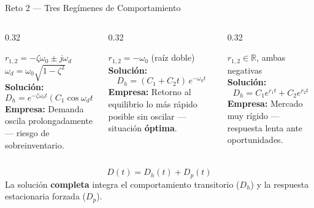 \documentclass[10pt,aspectratio=169]{beamer}
\begin{document}
\begin{frame}{Reto 2 — Tres Regímenes de Comportamiento}
  \begin{columns}[T]
    \begin{column}{0.32\textwidth}
      \begin{tcolorbox}[alertbox={Subamortiguado $\zeta < 1$}]
        \small
        $r_{1,2} = -\zeta\omega_0 \pm j\omega_d$\\[3pt]
        $\omega_d = \omega_0\sqrt{1-\zeta^2}$\\[6pt]
        \textbf{Solución:}
        \[
          D_h = e^{-\zeta\omega_0 t}
          (C_1\cos\omega_d t + C_2\sin\omega_d t)
        \]
        \small\textbf{Empresa:} Demanda oscila prolongadamente — riesgo de sobreinventario.
      \end{tcolorbox}
    \end{column}
    \begin{column}{0.32\textwidth}
      \begin{tcolorbox}[resultbox={Críticamente amortiguat. $\zeta=1$}]
        \small
        $r_{1,2} = -\omega_0$ (raíz doble)\\[6pt]
        \textbf{Solución:}
        \[
          D_h = (C_1 + C_2 t)\,e^{-\omega_0 t}
        \]
        \small\textbf{Empresa:} Retorno al equilibrio lo más rápido posible sin oscilar — situación \textbf{óptima}.
      \end{tcolorbox}
    \end{column}
    \begin{column}{0.32\textwidth}
      \begin{tcolorbox}[modelbox={Sobreamortiguado $\zeta > 1$}]
        \small
        $r_{1,2} \in \mathbb{R}$, ambas negativas\\[6pt]
        \textbf{Solución:}
        \[
          D_h = C_1 e^{r_1 t} + C_2 e^{r_2 t}
        \]
        \small\textbf{Empresa:} Mercado muy rígido — respuesta lenta ante oportunidades.
      \end{tcolorbox}
    \end{column}
  \end{columns}

  \vspace{8pt}
  \begin{tcolorbox}[resultbox={Solución general}]
    \[
      D(t) = D_h(t) + D_p(t)
    \]
    La solución \textbf{completa} integra el comportamiento transitorio ($D_h$)
    y la respuesta estacionaria forzada ($D_p$).
  \end{tcolorbox}
\end{frame}
\end{document}
